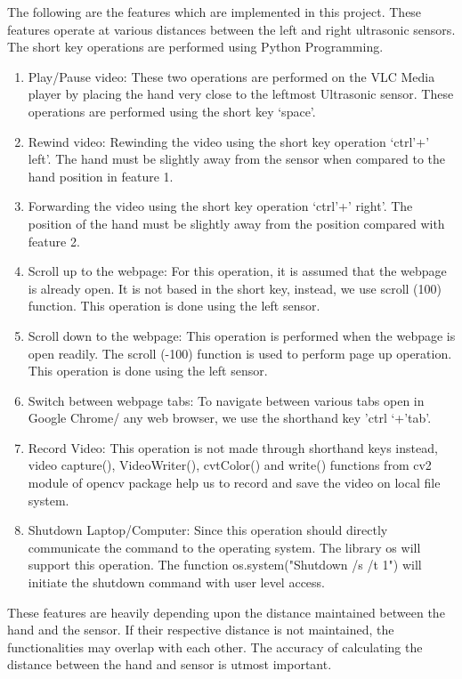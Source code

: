 \documentclass[12pt,journal]{IEEEtran}
\begin{document}
\newpage
\par The following are the features which are implemented in this project. These features operate at various distances between the left and right ultrasonic sensors. The short key operations are performed using Python Programming.
\bigskip
\begin{enumerate}
  \item Play/Pause video: These two operations are performed on the VLC Media player by placing the hand very close to the leftmost Ultrasonic sensor. These operations are performed using the short key ‘space’.
  \bigskip
  \item Rewind video:  Rewinding the video using the short key operation ‘ctrl’+’ left’. The hand must be slightly away from the sensor when compared to the hand position in feature 1.
  \bigskip
  \item Forwarding the video using the short key operation ‘ctrl’+’ right’. The position of the hand must be slightly away from the position compared with feature 2.
  \bigskip
  \item Scroll up to the webpage: For this operation, it is assumed that the webpage is already open. It is not based in the short key, instead, we use scroll (100) function. This operation is done using the left sensor.
  \bigskip
  \item Scroll down to the webpage: This operation is performed when the webpage is open readily. The scroll (-100) function is used to perform page up operation. This operation is done using the left sensor.
  \bigskip
  \item Switch between webpage tabs: To navigate between various tabs open in Google Chrome/ any web browser, we use the shorthand key 'ctrl ‘+’tab'.
  \bigskip
  \item Record Video: This operation is not made through shorthand keys instead, video capture(), VideoWriter(), cvtColor() and write() functions from cv2 module of opencv package help us to record and save the video on local file system.
  \bigskip
  \item Shutdown Laptop/Computer: Since this operation should directly communicate the command to the operating system. The library os will support this operation. The function os.system("Shutdown /s /t 1") will initiate the shutdown command with user level access.
\end{enumerate}
\bigskip
\par
These features are heavily depending upon the distance maintained between the hand and the sensor. If their respective distance is not maintained, the functionalities may overlap with each other. The accuracy of calculating the distance between the hand and sensor is utmost important.
\end{document}
